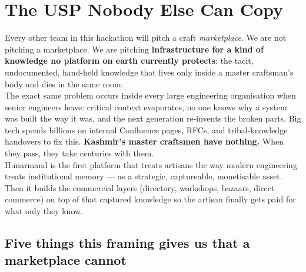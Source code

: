 \documentclass[11pt, a4paper]{article}
\begin{document}
\section{The USP Nobody Else Can Copy}

\begin{insightbox}
Every other team in this hackathon will pitch a craft \textit{marketplace}. We are not pitching a marketplace. We are pitching {\bfseries infrastructure for a kind of knowledge no platform on earth currently protects}: the tacit, undocumented, hand-held knowledge that lives only inside a master craftsman's body and dies in the same room.\\[5pt]
The exact same problem occurs inside every large engineering organisation when senior engineers leave: critical context evaporates, no one knows why a system was built the way it was, and the next generation re-invents the broken parts. Big tech spends billions on internal Confluence pages, RFCs, and tribal-knowledge handovers to fix this. {\bfseries Kashmir's master craftsmen have nothing.} When they pass, they take centuries with them.\\[5pt]
Hunarmand is the first platform that treats artisans the way modern engineering treats institutional memory --- as a strategic, captureable, monetisable asset. Then it builds the commercial layers (directory, workshops, bazaars, direct commerce) on top of that captured knowledge so the artisan finally gets paid for what only they know.
\end{insightbox}

\subsection{Five things this framing gives us that a marketplace cannot}
\end{document}
